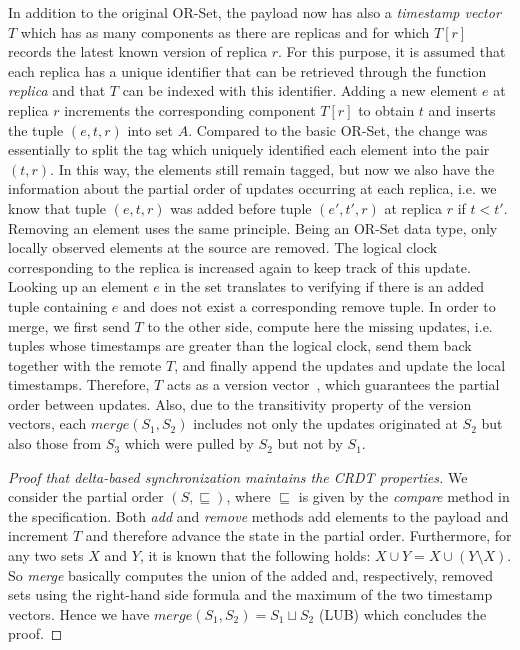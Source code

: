 In addition to the original OR-Set, the payload now has also a \textit{timestamp
vector} $T$ which has as many components as there are replicas and for which
$T[r]$ records the latest known version of replica $r$. For this purpose, it is
assumed that each replica has a unique identifier that can be retrieved through
the function \textit{replica} and that $T$ can be indexed with this identifier.
Adding a new element $e$ at replica $r$ increments the corresponding component
$T[r]$ to obtain $t$ and inserts the tuple $(e, t, r)$ into set $A$. Compared to
the basic OR-Set, the change was essentially to split the tag which uniquely
identified each element into the pair $(t, r)$. In this way, the elements still
remain tagged, but now we also have the information about the partial order of
updates occurring at each replica, i.e. we know that tuple $(e, t, r)$ was added
before tuple $(e', t', r)$ at replica $r$ if $t < t'$. Removing an element uses
the same principle. Being an OR-Set data type, only locally observed elements at
the source are removed. The logical clock corresponding to the replica is
increased again to keep track of this update. Looking up an element $e$ in the
set translates to verifying if there is an added tuple containing $e$ and does
not exist a corresponding remove tuple. In order to merge, we first send $T$ to
the other side, compute here the missing updates, i.e. tuples whose timestamps
are greater than the logical clock, send them back together with the remote $T$,
and finally append the updates and update the local timestamps. Therefore, $T$
acts as a version vector~\cite{Parker:1983:DMI:1313337.1313753}, which
guarantees the partial order between updates. Also, due to the transitivity
property of the version vectors, each $\textit{merge}(S_{1}, S_{2})$ includes
not only the updates originated at $S_{2}$ but also those from $S_{3}$ which
were pulled by $S_{2}$ but not by $S_{1}$.

\begin{proof}[Proof that delta-based synchronization maintains the CRDT
properties] 
We consider the partial order $(S, \sqsubseteq)$, where $\sqsubseteq$ is given
by the \textit{compare} method in the specification. Both \textit{add} and
\textit{remove} methods add elements to the payload and increment $T$ and
therefore advance the state in the partial order. Furthermore, for any two sets
$X$ and $Y$, it is known that the following holds: $X \cup Y = X \cup (Y
\setminus X)$. So \textit{merge} basically computes the union of the added and,
respectively, removed sets using the right-hand side formula and the maximum of
the two timestamp vectors. Hence we have $\textit{merge}(S_{1}, S_{2}) = S_{1}
\sqcup S_{2}$ (LUB) which concludes the proof.
\end{proof}